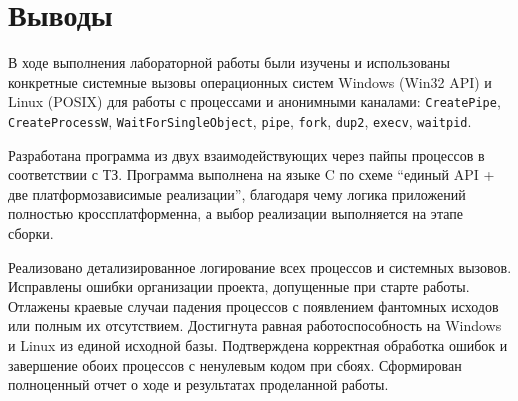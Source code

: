 \section{Выводы}

В ходе выполнения лабораторной работы были изучены и использованы конкретные системные вызовы операционных систем Windows
(Win32 API) и Linux (POSIX) для работы с процессами и анонимными каналами: \texttt{CreatePipe},
\texttt{CreateProcessW}, \texttt{WaitForSingleObject}, \texttt{pipe}, \texttt{fork}, \texttt{dup2},
\texttt{execv}, \texttt{waitpid}.

Разработана программа из двух взаимодействующих через пайпы процессов в соответствии с ТЗ. Программа выполнена на языке
C по схеме \enquote{единый API + две платформозависимые реализации}, благодаря чему логика
приложений полностью кроссплатформенна, а выбор реализации выполняется на этапе сборки.

Реализовано детализированное логирование всех процессов и системных вызовов.
Исправлены ошибки организации проекта, допущенные при старте работы.
Отлажены краевые случаи падения процессов с появлением фантомных исходов или полным их отсутствием.
Достигнута равная работоспособность на Windows и Linux из единой исходной базы.
Подтверждена корректная обработка ошибок и завершение обоих процессов с ненулевым кодом при сбоях.
Сформирован полноценный отчет о ходе и результатах проделанной работы.
\pagebreak